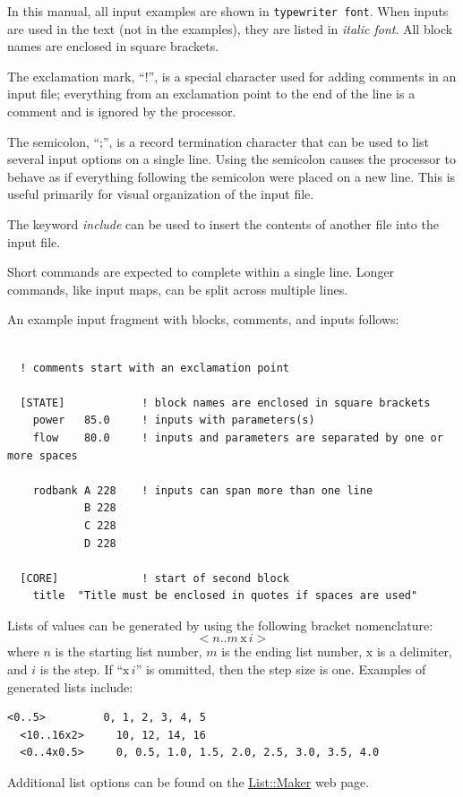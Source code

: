 \documentclass{vera-ornltm}
\begin{document}
In this manual, all input examples are shown in {\tt typewriter font}.
When inputs are used in the text (not in the examples), they are listed in {\it italic font}.
All block names are enclosed in square brackets.

The exclamation mark, ``!'',  is a special character used for adding comments in an input file; everything from an exclamation point to the
end of the line is a comment and is ignored by the processor.

The semicolon, ``;'', is a record termination character that can be used to list several input options on a single line.  Using the semicolon causes the processor to behave as if everything following the semicolon were placed on a new line.  This is useful primarily for visual organization of the input file.

The keyword {\it include} can be used to insert the contents of another file into the input file.

Short commands are expected to complete within a single line. Longer commands, like input maps,
can be split across multiple lines.

An example input fragment with blocks, comments, and inputs follows:
\begin{Verbatim}[fontsize=\small]

  ! comments start with an exclamation point

  [STATE]            ! block names are enclosed in square brackets
    power   85.0     ! inputs with parameters(s)
    flow    80.0     ! inputs and parameters are separated by one or more spaces

    rodbank A 228    ! inputs can span more than one line
            B 228
            C 228
            D 228

  [CORE]             ! start of second block
    title  "Title must be enclosed in quotes if spaces are used"

\end{Verbatim}

Lists of values can be generated by using the following bracket nomenclature:
$$ < n .. m \, \mbox{x} \, i > $$
where $n$ is the starting list number, $m$ is the ending list number, $\mbox{x}$ is a delimiter, and $i$ is the step.
If ``$\mbox{x} \, i$'' is ommitted, then the step size is one.
Examples of generated lists include:
\begin{Verbatim}[fontsize=\small]
  <0..5>         0, 1, 2, 3, 4, 5
  <10..16x2>     10, 12, 14, 16
  <0..4x0.5>     0, 0.5, 1.0, 1.5, 2.0, 2.5, 3.0, 3.5, 4.0

\end{Verbatim}
Additional list options can be found on the \href{https://metacpan.org/pod/release/DCONWAY/List-Maker-0.005/lib/List/Maker.pm}{List::Maker} web page.
\end{document}
